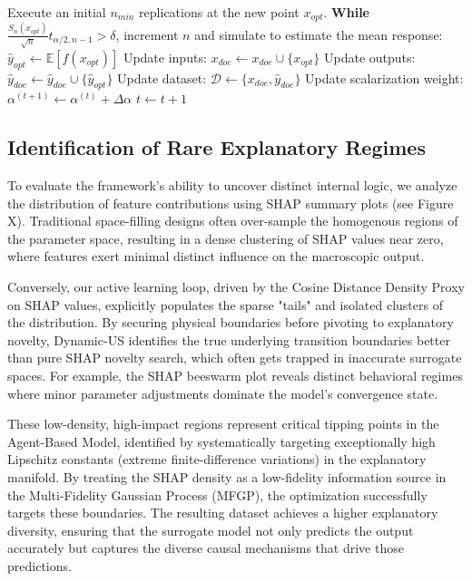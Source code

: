 \documentclass[sn-mathphys]{sn-jnl}
\theoremstyle{thmstyleone}%
\theoremstyle{thmstyletwo}%
\theoremstyle{thmstylethree}%
\begin{document}
\begin{algorithm}[hbt!]
{    \vspace{2mm}
    Execute an initial $n_{min}$ replications at the new point $x_{opt}$. \textbf{While} $\frac{S_n(x_{opt})}{\sqrt{n}} t_{\alpha/2, n-1} > \delta$, increment $n$ and simulate to estimate the mean response: $\hat{y}_{opt} \leftarrow \mathbb{E}[f(x_{opt})]$\;
    Update inputs: $x_{doe} \leftarrow x_{doe} \cup \{x_{opt}\}$\;
    Update outputs: $\hat{y}_{doe} \leftarrow \hat{y}_{doe} \cup \{\hat{y}_{opt}\}$\;
    Update dataset: $\mathcal{D} \leftarrow \{x_{doe}, \hat{y}_{doe}\}$\;
    Update scalarization weight: $\alpha^{(t+1)} \leftarrow \alpha^{(t)} + \Delta \alpha$\;
    $t \leftarrow t + 1$\;
}
\caption{Black-box Active Learning for Discovering New Explanations}
\label{algo:active_learning}
\end{algorithm}




\subsection{Identification of Rare Explanatory Regimes}

To evaluate the framework's ability to uncover distinct internal logic, we analyze the distribution of feature contributions using SHAP summary plots (see Figure X). Traditional space-filling designs often over-sample the homogenous regions of the parameter space, resulting in a dense clustering of SHAP values near zero, where features exert minimal distinct influence on the macroscopic output.

Conversely, our active learning loop, driven by the Cosine Distance Density Proxy on SHAP values, explicitly populates the sparse "tails" and isolated clusters of the distribution. By securing physical boundaries before pivoting to explanatory novelty, Dynamic-US identifies the true underlying transition boundaries better than pure SHAP novelty search, which often gets trapped in inaccurate surrogate spaces. For example, the SHAP beeswarm plot reveals distinct behavioral regimes where minor parameter adjustments dominate the model's convergence state. 

These low-density, high-impact regions represent critical tipping points in the Agent-Based Model, identified by systematically targeting exceptionally high Lipschitz constants (extreme finite-difference variations) in the explanatory manifold. By treating the SHAP density as a low-fidelity information source in the Multi-Fidelity Gaussian Process (MFGP), the optimization successfully targets these boundaries. The resulting dataset achieves a higher explanatory diversity, ensuring that the surrogate model not only predicts the output accurately but captures the diverse causal mechanisms that drive those predictions.
\end{document}
